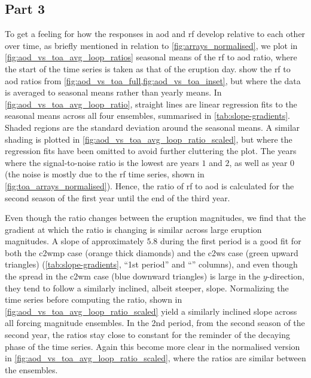 \documentclass{ametsocV5}
\begin{document}
\subsection{Part 3}

To get a feeling for how the responses in \ac{aod} and \ac{rf} develop relative to each
other over time, as briefly mentioned in relation to \cref{fig:arrays_normalised}, we
plot in \cref{fig:aod_vs_toa_avg_loop_ratios} seasonal means of the \ac{rf} to \ac{aod}
ratio, where the start of the time series is taken as that of the eruption day.
 show the
\ac{rf} to \ac{aod} ratios from \cref{fig:aod_vs_toa_full,fig:aod_vs_toa_inset}, but
where the data is averaged to seasonal means rather than yearly means. In
\cref{fig:aod_vs_toa_avg_loop_ratio}, straight lines are linear regression fits to the
seasonal means across all four ensembles, summarised in \cref{tab:slope-gradients}.
Shaded regions are the standard deviation around the seasonal means. A similar shading
is plotted in \cref{fig:aod_vs_toa_avg_loop_ratio_scaled}, but where the regression fits
have been omitted to avoid further cluttering the plot. The years where the
signal-to-noise ratio is the lowest are years \(1\) and \(2\), as well as year \(0\)
(the noise is mostly due to the \ac{rf} time series, shown in
\cref{fig:toa_arrays_normalised}). Hence, the ratio of \ac{rf} to \ac{aod} is calculated
for the second season of the first year until the end of the third year.

Even though the ratio changes between the eruption magnitudes, we find that the gradient
at which the ratio is changing is similar across large eruption magnitudes. A slope of
approximately \(5.8\) during the first period is a good fit for both the \ac{c2wmp} case
(orange thick diamonds) and the \ac{c2ws} case (green upward triangles)
(\cref{tab:slope-gradients}, ``1st period'' and ``''
columns), and even though the spread in the \ac{c2wm} case (blue downward triangles) is
large in the \(y\)-direction, they tend to follow a similarly inclined, albeit steeper,
slope. Normalizing the time series before computing the ratio, shown in
\cref{fig:aod_vs_toa_avg_loop_ratio_scaled} yield a similarly inclined slope across all
forcing magnitude ensembles. In the 2nd period, from the second season of the second
year, the ratios stay close to constant for the reminder of the decaying phase of the
time series. Again this become more clear in the normalised version in
\cref{fig:aod_vs_toa_avg_loop_ratio_scaled}, where the ratios are similar between the
ensembles.
\end{document}
